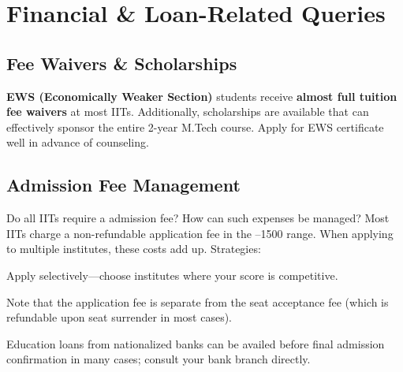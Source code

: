 
\chapter{Financial \& Loan-Related Queries}
\label{chap:financial}

\section{Fee Waivers \& Scholarships}
\label{sec:waivers}

\begin{eligalert}
  \textbf{EWS (Economically Weaker Section)} students receive \textbf{almost
  full tuition fee waivers} at most IITs. Additionally, scholarships are
  available that can effectively sponsor the entire 2-year M.Tech course.
  Apply for EWS certificate well in advance of counseling.
\end{eligalert}

\section{Admission Fee Management}
\label{sec:admission-fee}

\begin{faqentry}{Do all IITs require a  admission fee?
  How can such expenses be managed?}
  Most IITs charge a non-refundable application fee in the --1500 range.
  When applying to multiple institutes, these costs add up. Strategies:
  \begin{pfChecklist}
    \item Apply selectively---choose institutes where your \GATE score is
          competitive.
    \item Note that the application fee is separate from the seat acceptance fee
          (which is refundable upon seat surrender in most cases).
    \item Education loans from nationalized banks can be availed before final
          admission confirmation in many cases; consult your bank branch directly.
  \end{pfChecklist}
\end{faqentry}

